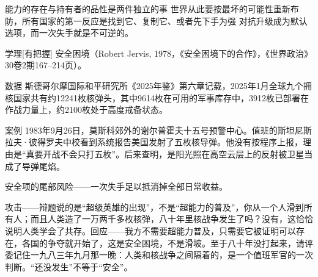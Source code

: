 \documentclass[prep,both]{debate}
\begin{document}
\begin{fields}
\begin{mechanism}[机制]
\step 能力的存在与持有者的品性是两件独立的事
\step 世界从此要按最坏的可能性重新布防，所有国家的第一反应是找到它、复制它、或者先下手为强
\step 对抗升级成为默认选项，而一次失手就是不可逆的。

\end{mechanism}
\begin{evidence}{学理}[有把握]
安全困境（Robert Jervis, 1978，《安全困境下的合作》，《世界政治》30卷2期167–214页）。
\end{evidence}
\begin{evidence}{数据}
斯德哥尔摩国际和平研究所《2025年鉴》第六章记载，2025年1月全球九个拥核国家共有约12241枚核弹头，其中9614枚在可用的军事库存中，3912枚已部署在作战力量上，约2100枚处于高度戒备状态。
\end{evidence}
\begin{evidence}{案例}
1983年9月26日，莫斯科郊外的谢尔普霍夫十五号预警中心。值班的斯坦尼斯拉夫·彼得罗夫中校看到系统报告美国发射了五枚核导弹。他没有按程序上报，理由是“真要开战不会只打五枚”。后来查明，是阳光照在高空云层上的反射被卫星当成了导弹尾焰。
\end{evidence}
\closing[回扣判准]{安全项的尾部风险——一次失手足以抵消掉全部日常收益。}
\begin{clash}
攻击——辩题说的是“超级英雄的出现”，不是“超能力的普及”，你从一个人滑到所有人；而且人类造了一万两千多枚核弹，八十年里核战争发生了吗？没有，这恰恰说明人类学会了共存。回应——我方不需要超能力普及，只需要它被证明可以存在，各国的争夺就开始了，这是安全困境，不是滑坡。至于八十年没打起来，请评委记住一九八三年九月那一晚：人类和核战争之间隔着的，是一个值班军官的一次判断。“还没发生”不等于“安全”。
\end{clash}
\end{fields}
\end{document}
